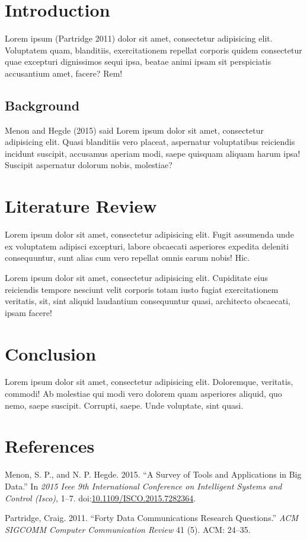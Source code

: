 \chapter{Introduction}\label{introduction}

Lorem ipsum (Partridge 2011) dolor sit amet, consectetur adipisicing
elit. Voluptatem quam, blanditiis, exercitationem repellat corporis
quidem consectetur quae excepturi dignissimos sequi ipsa, beatae animi
ipsam sit perspiciatis accusantium amet, facere? Rem!

\section{Background}\label{background}

Menon and Hegde (2015) said Lorem ipsum dolor sit amet, consectetur
adipisicing elit. Quasi blanditiis vero placeat, aspernatur voluptatibus
reiciendis incidunt suscipit, accusamus aperiam modi, saepe quisquam
aliquam harum ipsa! Suscipit aspernatur dolorum nobis, molestiae?

\chapter{Literature Review}\label{literature-review}

Lorem ipsum dolor sit amet, consectetur adipisicing elit. Fugit
assumenda unde ex voluptatem adipisci excepturi, labore obcaecati
asperiores expedita deleniti consequuntur, sunt alias cum vero repellat
omnis earum nobis! Hic.

Lorem ipsum dolor sit amet, consectetur adipisicing elit. Cupiditate
eius reiciendis tempore nesciunt velit corporis totam iusto fugiat
exercitationem veritatis, sit, sint aliquid laudantium consequuntur
quasi, architecto obcaecati, ipsam facere!

\chapter{Conclusion}\label{conclusion}

Lorem ipsum dolor sit amet, consectetur adipisicing elit. Doloremque,
veritatis, commodi! Ab molestiae qui modi vero dolorem quam asperiores
aliquid, quo nemo, saepe suscipit. Corrupti, saepe. Unde voluptate, sint
quasi.

\chapter*{References}\label{references}

\hypertarget{refs}{}
\hypertarget{ref-7282364}{}
Menon, S. P., and N. P. Hegde. 2015. ``A Survey of Tools and
Applications in Big Data.'' In \emph{2015 Ieee 9th International
Conference on Intelligent Systems and Control (Isco)}, 1--7.
doi:\href{https://doi.org/10.1109/ISCO.2015.7282364}{10.1109/ISCO.2015.7282364}.

\hypertarget{ref-partridge2011forty}{}
Partridge, Craig. 2011. ``Forty Data Communications Research
Questions.'' \emph{ACM SIGCOMM Computer Communication Review} 41 (5).
ACM: 24--35.

